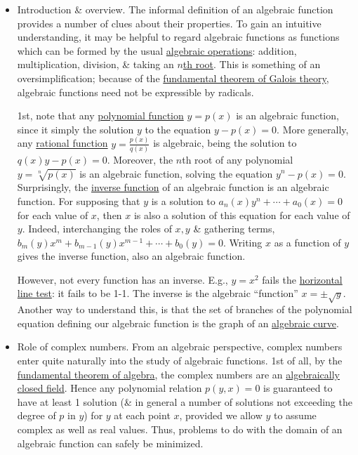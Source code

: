 \documentclass{article}
\begin{document}
\begin{itemize}
	\item {\sf Introduction \& overview.} The informal definition of an algebraic function provides a number of clues about their properties. To gain an intuitive understanding, it may be helpful to regard algebraic functions as functions which can be formed by the usual \href{https://en.wikipedia.org/wiki/Algebraic_operations}{algebraic operations}: addition, multiplication, division, \& taking an \href{https://en.wikipedia.org/wiki/Nth_root}{$n$th root}. This is something of an oversimplification; because of the \href{https://en.wikipedia.org/wiki/Fundamental_theorem_of_Galois_theory}{fundamental theorem of Galois theory}, algebraic functions need not be expressible by radicals.
	
	1st, note that any \href{https://en.wikipedia.org/wiki/Polynomial_function}{polynomial function} $y = p(x)$ is an algebraic function, since it simply the solution $y$ to the equation $y - p(x) = 0$. More generally, any \href{https://en.wikipedia.org/wiki/Rational_function}{rational function} $y = \frac{p(x)}{q(x)}$ is algebraic, being the solution to $q(x)y - p(x) = 0$. Moreover, the $n$th root of any polynomial $y = \sqrt[n]{p(x)}$ is an algebraic function, solving the equation $y^n - p(x) = 0$. Surprisingly, the \href{https://en.wikipedia.org/wiki/Inverse_function}{inverse function} of an algebraic function is an algebraic function. For supposing that $y$ is a solution to $a_n(x)y^n + \cdots + a_0(x) = 0$ for each value of $x$, then $x$ is also a solution of this equation for each value of $y$. Indeed, interchanging the roles of $x,y$ \& gathering terms, $b_m(y)x^m + b_{m-1}(y)x^{m-1} + \cdots + b_0(y) = 0$. Writing $x$ as a function of $y$ gives the inverse function, also an algebraic function.
	
	However, not every function has an inverse. E.g., $y = x^2$ fails the \href{https://en.wikipedia.org/wiki/Horizontal_line_test}{horizontal line test}: it fails to be 1-1. The inverse is the algebraic ``function'' $x = \pm\sqrt{y}$. Another way to understand this, is that the set of branches of the polynomial equation defining our algebraic function is the graph of an \href{https://en.wikipedia.org/wiki/Algebraic_curve}{algebraic curve}.
	\item {\sf Role of complex numbers.} From an algebraic perspective, complex numbers enter quite naturally into the study of algebraic functions. 1st of all, by the \href{https://en.wikipedia.org/wiki/Fundamental_theorem_of_algebra}{fundamental theorem of algebra}, the complex numbers are an \href{https://en.wikipedia.org/wiki/Algebraically_closed_field}{algebraically closed field}. Hence any polynomial relation $p(y,x) = 0$ is guaranteed to have at least 1 solution (\& in general a number of solutions not exceeding the degree of $p$ in $y$) for $y$ at each point $x$, provided we allow $y$ to assume complex as well as real values. Thus, problems to do with the domain of an algebraic function can safely be minimized.
	

\end{itemize}
\end{document}
